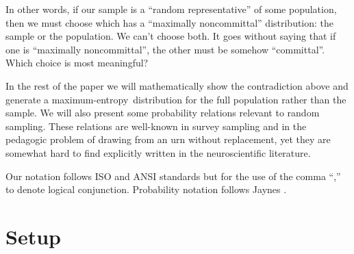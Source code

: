 \documentclass{article}
\theoremstyle{remark}
\theoremstyle{innote}
\newcommand*{\citep}{\parencites}
\renewcommand*{\|}{\mathpunct{|}}%
\theoremstyle{simple}
\newcommand*{\me}{maximum-entropy}
\begin{document}
In other words, if our sample is a \enquote{random representative} of some
population, then we must choose which has a \enquote{maximally
  noncommittal} distribution: the sample or the population. We can't choose
both. It goes without saying that if one is \enquote{maximally
  noncommittal}, the other must be somehow \enquote{committal}. Which
choice is most meaningful?

In the rest of the paper we will mathematically show the contradiction
above and generate a \me\ distribution for the full population rather than
the sample. We will also present some probability relations relevant to
random sampling. These relations are well-known in survey sampling and in
the pedagogic problem of drawing from an urn without replacement, yet they
are somewhat hard to find explicitly written in the neuroscientific
literature.

Our notation follows ISO and ANSI standards
\citep{iso1993,ieee1993,nist1995} but for the use of the comma \enquote{,}
to denote logical conjunction. Probability notation follows Jaynes
\citep{jaynes1994_r2003}.

\section{Setup}
\label{sec:setup}
\end{document}
